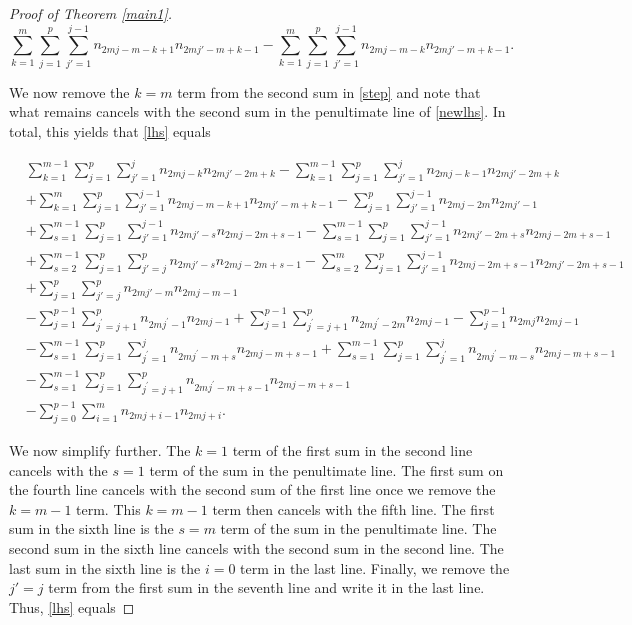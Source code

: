 \documentclass[11pt,reqno]{amsart}
\theoremstyle{definition}
\numberwithin{equation}{section}
\begin{document}
\begin{proof}[Proof of Theorem \ref{main1}]
\begin{equation} \label{step}
\sum_{k=1}^{m} \sum_{j=1}^{p} \sum_{j'=1}^{j-1} n_{2mj-m-k+1} n_{2mj'-m+k-1}
- \sum_{k=1}^{m} \sum_{j=1}^{p} \sum_{j'=1}^{j-1} n_{2mj-m-k} n_{2mj'-m+k-1}.
\end{equation}

\noindent We now remove the $k=m$ term from the second sum in \eqref{step} and note that what remains cancels with the second sum in the penultimate line of \eqref{newlhs}.
In total, this yields that \eqref{lhs} equals

\begin{equation} \label{newlhs1}
\begin{aligned}
& \sum_{k=1}^{m-1} \sum_{j=1}^{p} \sum_{j'=1}^{j} n_{2mj-k}n_{2mj' - 2m + k} -\sum_{k=1}^{m-1} \sum_{j=1}^{p} \sum_{j'=1}^{j} n_{2mj-k-1} n_{2mj' - 2m + k} \\
& + \sum_{k=1}^{m} \sum_{j=1}^{p} \sum_{j'=1}^{j-1} n_{2mj-m-k+1} n_{2mj'-m + k -1} - \sum_{j=1}^{p} \sum_{j'=1}^{j-1} n_{2mj-2m} n_{2mj'-1} \\
& + \sum_{s=1}^{m-1} \sum_{j=1}^{p} \sum_{j'=1}^{j-1} n_{2mj'-s}n_{2mj-2m+s-1} - \sum_{s=1}^{m-1} \sum_{j=1}^{p} \sum_{j'=1}^{j-1} n_{2mj'-2m+s} n_{2mj-2m+s-1}  \\
&+ \sum_{s=2}^{m-1} \sum_{j=1}^{p} \sum_{j'=j}^{p} n_{2mj'-s} n_{2mj-2m + s-1}  - \sum_{s=2}^{m} \sum_{j=1}^{p} \sum_{j'=1}^{j-1} n_{2mj-2m+s-1} n_{2mj' - 2m + s-1} \\
& + \sum_{j=1}^{p} \sum_{j'=j}^{p} n_{2mj'-m} n_{2mj-m-1} \\
& - \sum_{j=1}^{p - 1} \sum_{j^{\prime} = j+1}^{p} n_{2mj^{\prime} - 1}n_{2mj - 1} + \sum_{j=1}^{p - 1} \sum_{j^{\prime} = j+1}^{p} n_{2mj^{\prime} - 2m}n_{2mj - 1} -  \sum_{j=1}^{p - 1}n_{2mj} n_{2mj - 1}  \\
& - \sum_{s=1}^{m-1} \sum_{j=1}^{p}  \sum_{j^{\prime}=1}^{j} n_{2mj^{\prime} - m + s}n_{2mj - m + s - 1} +  \sum_{s=1}^{m-1} \sum_{j=1}^{p}  \sum_{j^{\prime}=1}^{j} n_{2mj^{\prime} - m - s}n_{2mj - m + s - 1}  \\
&-  \sum_{s=1}^{m-1} \sum_{j=1}^{p}\sum_{j^{\prime}=j+1}^{p} n_{2mj^{\prime} - m + s-1}n_{2mj - m + s - 1}  \\ 
& - \sum_{j=0}^{p-1} \sum_{i=1}^{m} n_{2mj+i-1}n_{2mj+i}.
\end{aligned}
\end{equation}

\noindent We now simplify further.  The $k=1$ term of the first sum in the second line cancels with the $s=1$ term of the sum in the penultimate line.  The first sum on the fourth line cancels with the second sum of the first line once we remove the $k=m-1$ term. This $k=m-1$ term then cancels with the fifth line.  The first sum in the sixth line is the $s=m$ term of the sum in the penultimate line. The second sum in the sixth line cancels with the second sum in the second line. The last sum in the sixth line is the $i=0$ term in the last line.  Finally, we remove the $j'=j$ term from the first sum in the seventh line and write it in the last line. Thus, \eqref{lhs} equals


\end{proof}
\end{document}
